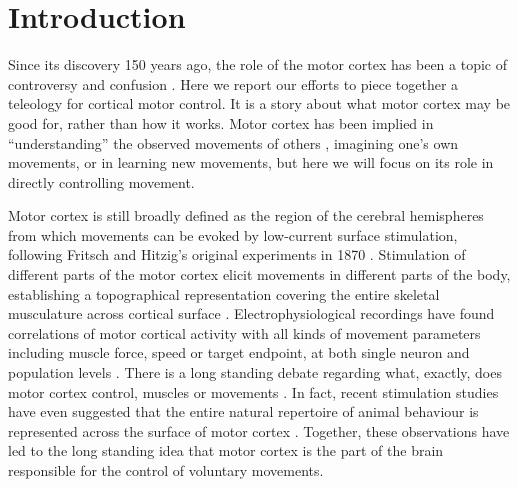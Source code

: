 \section{Introduction}

Since its discovery 150 years ago, the role of the motor cortex has been a topic of controversy and confusion \cite{Lashley1924}. Here we report our efforts to piece together a teleology for cortical motor control. It is a story about what motor cortex may be good for, rather than how it works. Motor cortex has been implied in ``understanding'' the observed movements of others \cite{Rizzolatti2004}, imagining one's own movements, or in learning new movements, but here we will focus on its role in directly controlling movement.

Motor cortex is still broadly defined as the region of the cerebral hemispheres from which movements can be evoked by low-current surface stimulation, following Fritsch and Hitzig's original experiments in 1870 \cite{Fritsch1870}. Stimulation of different parts of the motor cortex elicit movements in different parts of the body, establishing a topographical representation covering the entire skeletal musculature across cortical surface \cite{Leyton1917,Penfield1937,Neafsey1986}. Electrophysiological recordings have found correlations of motor cortical activity with all kinds of movement parameters including muscle force, speed or target endpoint, at both single neuron and population levels \cite{Georgopoulos1986}. There is a long standing debate regarding what, exactly, does motor cortex control, muscles or movements \cite{Todorov2000}. In fact, recent stimulation studies have even suggested that the entire natural repertoire of animal behaviour is represented across the surface of motor cortex \cite{Graziano2002,Aflalo2006}. Together, these observations have led to the long standing idea that motor cortex is the part of the brain responsible for the control of voluntary movements.

